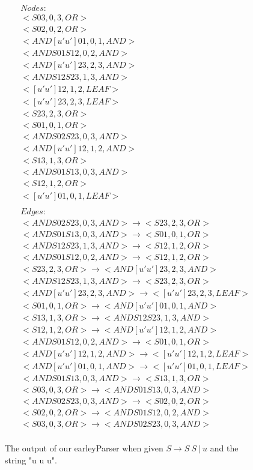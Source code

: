 \documentclass{sigplanconf}
\begin{document}
\begin{figure}
\begin{center}
\begin{align*}
&Nodes: \\
&<S03,0,3,OR> \\
&<S02,0,2,OR> \\
&<AND[u'u']01,0,1,AND> \\
&<ANDS01S12,0,2,AND> \\
&<AND[u'u']23,2,3,AND> \\
&<ANDS12S23,1,3,AND> \\
&<[u'u']12,1,2,LEAF> \\
&<[u'u']23,2,3,LEAF> \\
&<S23,2,3,OR> \\
&<S01,0,1,OR> \\
&<ANDS02S23,0,3,AND> \\
&<AND[u'u']12,1,2,AND> \\
&<S13,1,3,OR> \\
&<ANDS01S13,0,3,AND> \\
&<S12,1,2,OR> \\
&<[u'u']01,0,1,LEAF> \\
\\
&Edges: \\
&<ANDS02S23,0,3,AND>\longrightarrow<S23,2,3,OR> \\
&<ANDS01S13,0,3,AND>\longrightarrow<S01,0,1,OR> \\
&<ANDS12S23,1,3,AND>\longrightarrow<S12,1,2,OR> \\
&<ANDS01S12,0,2,AND>\longrightarrow<S12,1,2,OR> \\
&<S23,2,3,OR>\longrightarrow<AND[u'u']23,2,3,AND> \\
&<ANDS12S23,1,3,AND>\longrightarrow<S23,2,3,OR> \\
&<AND[u'u']23,2,3,AND>\longrightarrow<[u'u']23,2,3,LEAF> \\
&<S01,0,1,OR>\longrightarrow<AND[u'u']01,0,1,AND> \\
&<S13,1,3,OR>\longrightarrow<ANDS12S23,1,3,AND> \\
&<S12,1,2,OR>\longrightarrow<AND[u'u']12,1,2,AND> \\
&<ANDS01S12,0,2,AND>\longrightarrow<S01,0,1,OR> \\
&<AND[u'u']12,1,2,AND>\longrightarrow<[u'u']12,1,2,LEAF>  \\
&<AND[u'u']01,0,1,AND>\longrightarrow<[u'u']01,0,1,LEAF> \\
&<ANDS01S13,0,3,AND>\longrightarrow<S13,1,3,OR> \\
&<S03,0,3,OR>\longrightarrow<ANDS01S13,0,3,AND> \\
&<ANDS02S23,0,3,AND>\longrightarrow<S02,0,2,OR> \\
&<S02,0,2,OR>\longrightarrow<ANDS01S12,0,2,AND> \\
&<S03,0,3,OR>\longrightarrow<ANDS02S23,0,3,AND> \\
\end{align*}
\caption{The output of our earleyParser when given $S\longrightarrow{S\:{S\:{|\:{u}}}}$ and the string "u u u".} \label{fig:M6}
\end{center}
\end{figure}
\end{document}
